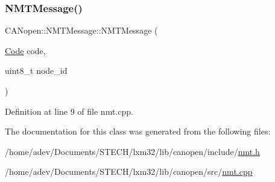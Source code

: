 \subsubsection{\texorpdfstring{N\+M\+T\+Message()}{NMTMessage()}\hspace{0.1cm}{\footnotesize\ttfamily [3/3]}}
{\footnotesize\ttfamily C\+A\+Nopen\+::\+N\+M\+T\+Message\+::\+N\+M\+T\+Message (\begin{DoxyParamCaption}\item[{\hyperlink{class_c_a_nopen_1_1_n_m_t_message_a20257f9fc32b84adc9196fd436f15e95}{Code}}]{code,  }\item[{uint8\+\_\+t}]{node\+\_\+id }\end{DoxyParamCaption})}



Definition at line 9 of file nmt.\+cpp.



The documentation for this class was generated from the following files\+:\begin{DoxyCompactItemize}
\item 
/home/adev/\+Documents/\+S\+T\+E\+C\+H/lxm32/lib/canopen/include/\hyperlink{nmt_8h}{nmt.\+h}\item 
/home/adev/\+Documents/\+S\+T\+E\+C\+H/lxm32/lib/canopen/src/\hyperlink{nmt_8cpp}{nmt.\+cpp}\end{DoxyCompactItemize}
